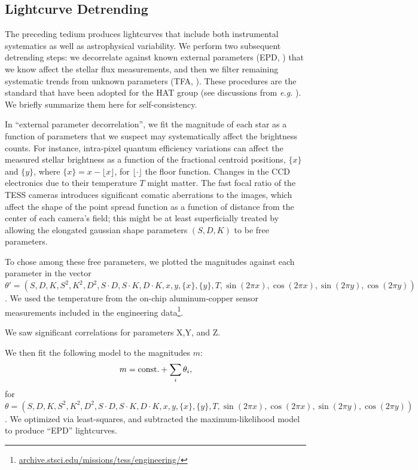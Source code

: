\documentclass[12pt,twocolumn,tighten]{aastex62}
\begin{document}
\subsection{Lightcurve Detrending}
\label{subsec:lcdetrending}

The preceding tedium produces lightcurves that include both
instrumental systematics as well as astrophysical variability.
We perform two subsequent detrending steps:
we decorrelate against known external parameters (EPD,
\citealt{bakos_2010}) that we know affect the stellar flux
measurements, and then we filter remaining systematic trends from
unknown parameters (TFA, \citealt{kovacs_trend_2005}).  These
procedures are the standard that have been adopted for the HAT group
(see discussions from {\it e.g.}
\citealt{huang_high-precision_2015,zhang_precision_2016}).
We briefly summarize them here for self-consistency.

In ``external parameter decorrelation'', we fit the magnitude of each star
as a function of parameters that we suspect may systematically affect
the brightness counts.
For instance, intra-pixel quantum efficiency variations can affect
the measured stellar brightness as a function of the fractional
centroid positions, $\{ x \}$ and $\{ y \}$, where $\{ x \} = x -
\lfloor x \rfloor$, for $\lfloor \cdot \rfloor$ the floor function.
Changes in the CCD electronics due to their temperature $T$ might
matter.
The fast focal ratio of the TESS cameras introduces significant
comatic aberrations to the images, which affect the shape of the point
spread function as a function of distance from the center of each
camera's field; this might be at least superficially treated by
allowing the elongated gaussian shape parameters $(S,D,K)$ to be free
parameters.

To chose among these free parameters, we plotted the magnitudes
against each parameter in the vector $\theta' = (S,D,K,S^2,K^2, D^2,
S\cdot D, S\cdot K, D\cdot K, x,y,\{x\},\{y\},T, \sin(2\pi x),
\cos(2\pi x), \sin(2\pi
y),\cos(2\pi y))$.
We used the temperature from the on-chip aluminum-copper sensor
measurements included in the engineering
data\footnote{\url{archive.stsci.edu/missions/tess/engineering/}}.

We saw significant correlations for parameters X,Y, and Z.

We then fit the following model to the magnitudes $m$:
\begin{equation}
  m = {\rm const.} + \sum_i \theta_i,
\end{equation}
for 
$\theta = (S,D,K,S^2,K^2, D^2, S\cdot D, S\cdot K, D\cdot K,
x,y,\{x\},\{y\},T, \sin(2\pi x), \cos(2\pi x), \sin(2\pi y),\cos(2\pi
y))$.
We optimized via least-squares, and subtracted the maximum-likelihood
model to produce ``EPD'' lightcurves.
\end{document}
